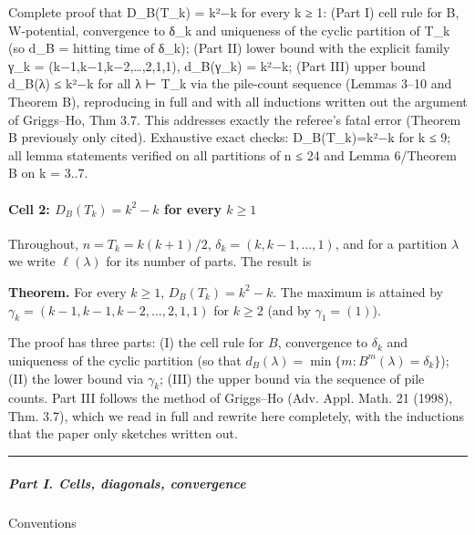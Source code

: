 
Complete proof that D\_B(T\_k) = k²−k for every k ≥ 1: (Part I) cell
rule for B, W-potential, convergence to δ\_k and uniqueness of the
cyclic partition of T\_k (so d\_B = hitting time of δ\_k); (Part II)
lower bound with the explicit family γ\_k = (k−1,k−1,k−2,\ldots,2,1,1),
d\_B(γ\_k) = k²−k; (Part III) upper bound d\_B(λ) ≤ k²−k for all λ ⊢
T\_k via the pile-count sequence (Lemmas 3--10 and Theorem B),
reproducing in full and with all inductions written out the argument of
Griggs--Ho, Thm 3.7. This addresses exactly the referee's fatal error
(Theorem B previously only cited). Exhaustive exact checks:
D\_B(T\_k)=k²−k for k ≤ 9; all lemma statements verified on all
partitions of n ≤ 24 and Lemma 6/Theorem B on k = 3..7.


\paragraph{\texorpdfstring{Cell 2: \(D_B(T_k)=k^2-k\) for every
\(k\ge 1\)}{Cell 2: D\_B(T\_k)=k\^{}2-k for every k\textbackslash ge 1}}\label{cell-2-d_bt_kk2-k-for-every-kge-1}

Throughout, \(n=T_k=k(k+1)/2\), \(\delta_k=(k,k-1,\dots,1)\), and for a
partition \(\lambda\) we write \(\ell(\lambda)\) for its number of
parts. The result is

\textbf{Theorem.} For every \(k\ge1\), \(D_B(T_k)=k^2-k\). The maximum
is attained by \(\gamma_k=(k-1,k-1,k-2,\dots,2,1,1)\) for \(k\ge2\) (and
by \(\gamma_1=(1)\)).

The proof has three parts: (I) the cell rule for \(B\), convergence to
\(\delta_k\) and uniqueness of the cyclic partition (so that
\(d_B(\lambda)=\min\{m: B^m(\lambda)=\delta_k\}\)); (II) the lower bound
via \(\gamma_k\); (III) the upper bound via the sequence of pile counts.
Part III follows the method of Griggs--Ho (Adv. Appl. Math. 21 (1998),
Thm. 3.7), which we read in full and rewrite here completely, with the
inductions that the paper only sketches written out.

\begin{center}\rule{0.5\linewidth}{0.5pt}\end{center}

\subparagraph{Part I. Cells, diagonals,
convergence}\label{part-i.-cells-diagonals-convergence}

Conventions


